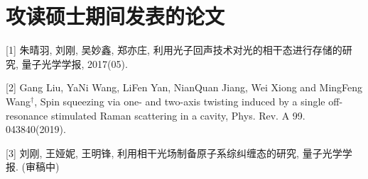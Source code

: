 




\chapter{攻读硕士期间发表的论文}
\vbox{}

\hspace{-0.85cm}[1] 朱晴羽, 刘刚, 吴妙鑫, 郑亦庄, 利用光子回声技术对光的相干态进行存储的研究, 量子光学学报, 2017(05).

\hspace{-0.85cm}[2] Gang Liu, YaNi Wang, LiFen Yan, NianQuan Jiang, Wei Xiong and MingFeng Wang$^\dagger$, Spin squeezing via one- and two-axis twisting induced by a single off-resonance stimulated Raman scattering in a cavity, Phys. Rev. A 99. 043840(2019).

\hspace{-0.85cm}[3] 刘刚, 王娅妮, 王明锋, 利用相干光场制备原子系综纠缠态的研究, 量子光学学报. (审稿中)

